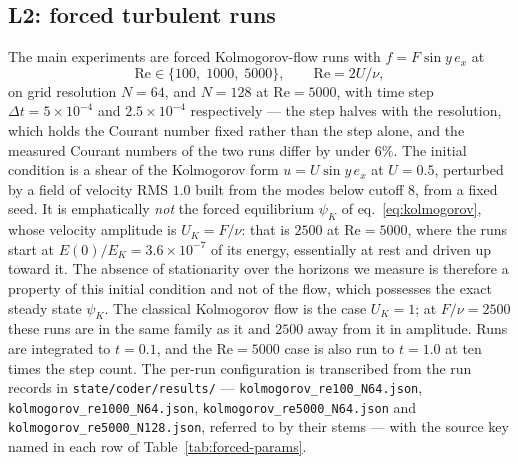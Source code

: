 \subsection{L2: forced turbulent runs}
\label{sec:forced}

The main experiments are forced Kolmogorov-flow runs with
$f = F\sin y\, e_x$ at
\begin{equation}
  \mathrm{Re} \in \{100,\; 1000,\; 5000\},
  \qquad \mathrm{Re} = 2U/\nu,
  \label{eq:re-set}
\end{equation}
on grid resolution $N = 64$, and $N = 128$ at $\mathrm{Re} = 5000$, with time
step $\Delta t = 5\times 10^{-4}$ and $2.5\times 10^{-4}$ respectively --- the
step halves with the resolution, which holds the Courant number fixed rather
than the step alone, and the measured Courant numbers of the two runs differ by
under $6\%$. The initial condition is a shear of the Kolmogorov form
$u = U \sin y\, e_x$ at $U = 0.5$, perturbed by a field of velocity RMS $1.0$
built from the modes below cutoff $8$, from a fixed seed. It is emphatically
\emph{not} the forced equilibrium $\psi_K$ of eq.~\eqref{eq:kolmogorov}, whose
velocity amplitude is $U_K = F/\nu$: that is $2500$ at $\mathrm{Re}=5000$, where
the runs start at $E(0)/E_K = 3.6\times 10^{-7}$ of its energy, essentially at
rest and driven up toward it. The absence of stationarity over the horizons we
measure is therefore a property of this initial condition and not of the flow,
which possesses the exact steady state $\psi_K$. The classical Kolmogorov flow is
the case $U_K = 1$; at $F/\nu = 2500$ these runs are in the same family as it and
$2500$ away from it in amplitude. Runs are integrated to $t = 0.1$, and the
$\mathrm{Re} = 5000$ case is also run to $t = 1.0$ at ten times the step count.
The per-run configuration is transcribed from the run records in
\texttt{state/coder/results/} ---
\texttt{kolmogorov\_re100\_N64.json}, \texttt{kolmogorov\_re1000\_N64.json},
\texttt{kolmogorov\_re5000\_N64.json} and
\texttt{kolmogorov\_re5000\_N128.json}, referred to by their stems --- with
the source key named in each row of Table~\ref{tab:forced-params}.

